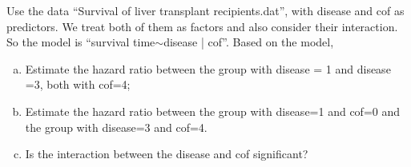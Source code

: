 \documentclass[12pt]{elegantbook}
\begin{document}
    \begin{exercise*}[2]
        Use the data “Survival of liver transplant recipients.dat”, with disease and cof as predictors. We treat both of them as factors and also consider their interaction. So the model is “survival time$\sim$disease | cof”. Based on the model,
        \begin{enumerate}[(a)]
            \item Estimate the hazard ratio between the group with disease = 1 and disease =3, both with cof=4; 
            \item Estimate the hazard ratio between the group with disease=1 and cof=0 and the group with disease=3 and cof=4. 
            \item Is the interaction between the disease and cof significant?
        \end{enumerate}
    \end{exercise*}
\end{document}
